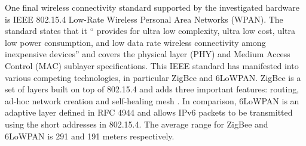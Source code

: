       One final wireless connectivity standard supported by the investigated hardware is IEEE 802.15.4 Low-Rate Wireless Personal Area Networks (WPAN). The standard states that it `` provides for ultra low complexity, ultra low cost, ultra low power consumption, and low data rate wireless connectivity among inexpensive devices'' and covers the physical layer (PHY) and Medium Access Control (MAC) sublayer specifications. This IEEE standard has manifested into various competing technologies, in particular ZigBee and 6LoWPAN. ZigBee is a set of layers built on top of 802.15.4 and adds three important features: routing, ad-hoc network creation and self-healing mesh \citep{buildingWSN:2010}. In comparison, 6LoWPAN is an adaptive layer defined in RFC 4944 and allows IPv6 packets to be transmitted using the short addresses in 802.15.4. The average range for ZigBee and 6LoWPAN is 291 and 191 meters respectively.

